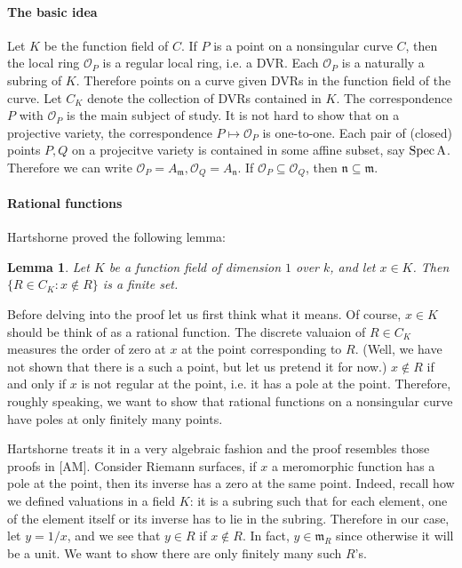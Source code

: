 \documentclass[12pt]{article}
\theoremstyle{plain}
\newtheorem{lemma}[equation]{Lemma}
\theoremstyle{definition}
\theoremstyle{named}
\newcommand{\fm}{\mathfrak{m}}
\newcommand{\fn}{\mathfrak{n}}
\newcommand{\sO}{\mathcal{O}}
\newcommand{\Spec}{\rm Spec\,}
\newcommand{\<}{\langle}
\renewcommand{\>}{\rangle}
\begin{document}
\paragraph{The basic idea} Let $K$ be the function field of $C$. If $P$ is a point on a nonsingular curve $C$, then the local ring $\sO_P$ is a regular local ring, i.e. a DVR. Each $\sO_P$ is a naturally a subring of $K$. Therefore points on a curve given DVRs in the function field of the curve. Let $C_K$ denote the collection of DVRs contained in $K$. The correspondence $P$ with $\sO_P$ is the main subject of study.  It is not hard to show that on a projective variety, the correspondence $P \mapsto \sO_P$ is one-to-one. Each pair of (closed) points $P, Q$ on a projecitve variety is contained in some affine subset, say $\Spec A$. Therefore we can write $\sO_P = A_\fm, \sO_Q = A_\fn$. If $\sO_P \subseteq \sO_Q$, then $\fn \subseteq \fm$. 

\paragraph{Rational functions} Hartshorne proved the following lemma: 
\begin{lemma} 
\label{main}
Let $K$ be a function field of dimension $1$ over $k$, and let $x \in K$. Then $\{ R \in C_K : x \not\in R \}$ is a finite set.  
\end{lemma}
Before delving into the proof let us first think what it means. Of course, $x \in K$ should be think of as a rational function. The discrete valuaion of $R \in C_K$ measures the order of zero at $x$ at the point corresponding to $R$. (Well, we have not shown that there is a such a point, but let us pretend it for now.) $x \not\in R$ if and only if $x$ is not regular at the point, i.e. it has a pole at the point. Therefore, roughly speaking, we want to show that rational functions on a nonsingular curve have poles at only finitely many points.  

Hartshorne treats it in a very algebraic fashion and the proof resembles those proofs in [AM]. Consider Riemann surfaces, if $x$ a meromorphic function has a pole at the point, then its inverse has a zero at the same point. Indeed, recall how we defined valuations in a field $K$: it is a subring such that for each element, one of the element itself or its inverse has to lie in the subring. Therefore in our case, let $y = 1/x$, and we see that $y \in R$ if $x \not\in R$. In fact, $y \in \fm_R$ since otherwise it will be a unit. We want to show there are only finitely many such $R$'s. 
\end{document}
